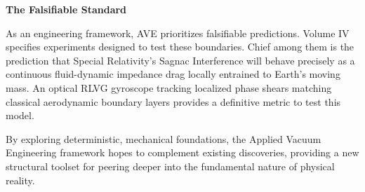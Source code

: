 \vspace{2em}
\noindent \textbf{The Falsifiable Standard}

\noindent As an engineering framework, AVE prioritizes falsifiable predictions. Volume IV specifies experiments designed to test these boundaries. Chief among them is the prediction that Special Relativity's Sagnac Interference will behave precisely as a continuous fluid-dynamic impedance drag locally entrained to Earth’s moving mass. An optical RLVG gyroscope tracking localized phase shears matching classical aerodynamic boundary layers provides a definitive metric to test this model.

By exploring deterministic, mechanical foundations, the Applied Vacuum Engineering framework hopes to complement existing discoveries, providing a new structural toolset for peering deeper into the fundamental nature of physical reality. 
